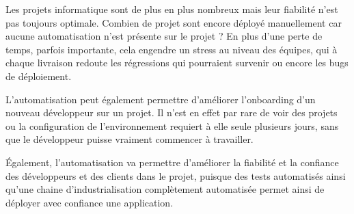 \vfill
	Les projets informatique sont de plus en plus nombreux mais leur fiabilité n'est pas toujours optimale. Combien de projet sont encore déployé manuellement car aucune automatisation n'est présente sur le projet ? En plus d'une perte de temps, parfois importante, cela engendre un stress au niveau des équipes, qui à chaque livraison redoute les régressions qui pourraient survenir ou encore les bugs de déploiement.
	
	L'automatisation peut également permettre d'améliorer l'onboarding d'un nouveau développeur sur un projet. Il n'est en effet par rare de voir des projets ou la configuration de l'environnement requiert à elle seule plusieurs jours, sans que le développeur puisse vraiment commencer à travailler.
	
	Également, l'automatisation va permettre d'améliorer la fiabilité et la confiance des développeurs et des clients dans le projet, puisque des tests automatisés ainsi qu'une chaine d'industrialisation complètement automatisée permet ainsi de déployer avec confiance une application.
	
\vfill